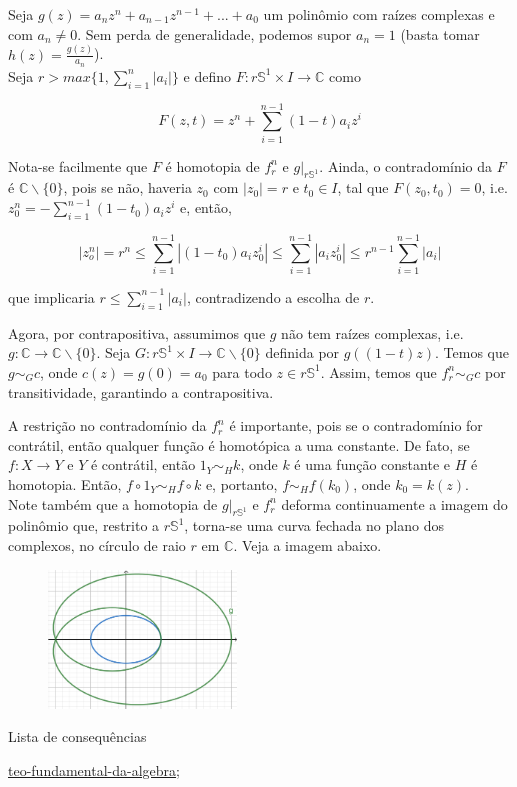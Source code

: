 \begin{dem}
    Seja $g(z) = a_nz^n + a_{n - 1}z^{n - 1} +...+ a_0$
um polinômio com raízes complexas e com $a_n \neq 0$. Sem perda de generalidade, podemos supor $a_n = 1$ (basta tomar $h(z) = \frac{g(z)}{a_n}$).\\ Seja $r > max\{1, \sum_{i = 1}^n|a_i|\}$ e defino $F:r\mathbb{S}^1\times I \rightarrow \mathbb{C}$ como

$$F(z, t) = z^n + \sum_{i = 1}^{n-1}(1 - t)a_iz^i$$

Nota-se facilmente que $F$ é homotopia de $f_r^n$ e $g|_{r\mathbb{S}^1}$. Ainda, o contradomínio da $F$ é $\mathbb{C}\backslash \{0\}$, pois se não, haveria $z_0$ com $|z_0| = r$ e $t_0 \in I$, tal que $F(z_0, t_0) = 0$, i.e. $z_0^n = -\sum_{i = 1}^{n - 1}(1 - t_0)a_iz^i$ e, então, 

$$|z_o^n| = r^n \leq \sum_{i = 1}^{n - 1}|(1 - t_0)a_iz_0^i| \leq \sum_{i = 1}^{n - 1}|a_iz_0^i| \leq r^{n-1}\sum_{i = 1}^{n - 1}|a_i|$$

que implicaria $r \leq \sum_{i = 1}^{n - 1}|a_i|$, contradizendo a escolha de $r$.

Agora, por contrapositiva, assumimos que $g$ não tem raízes complexas, i.e. $g:\mathbb{C} \rightarrow \mathbb{C}\backslash\{0\}$. Seja $G: r\mathbb{S}^1\times I \rightarrow \mathbb{C}\backslash\{0\}$ definida por $g((1 - t)z)$. Temos que $g \sim_G c$, onde $c(z) = g(0) = a_0$ para todo $z \in r\mathbb{S}^1$. Assim, temos que $f_r^n \sim_G c$ por transitividade, garantindo a contrapositiva.  

\end{dem}
A restrição no contradomínio da $f_r^n$ é importante, pois se o contradomínio for contrátil, então qualquer função é homotópica a uma constante. De fato, se $f:X \rightarrow Y$ e $Y$ é contrátil, então $1_Y \sim_H k$, onde $k$ é uma função constante e $H$ é homotopia. Então, $f\circ1_Y \sim_H f\circ k$ e, portanto, $f \sim_H f(k_0)$, onde $k_0 = k(z)$. \\

Note também que a homotopia de $g|_{r\mathbb{S}^1}$ e $f_r^n$ deforma continuamente a imagem do polinômio que, restrito a $r\mathbb{S}^1$, torna-se uma curva fechada no plano dos complexos, no círculo de raio $r$ em $\mathbb{C}$. Veja a imagem abaixo.

\begin{figure}[h]
\includegraphics[width = 5cm]{homotopia.png}
\end{figure}

\begin{titlemize}{Lista de consequências}
	\item \hyperref[teo-fundamental-da-algebra]{teo-fundamental-da-algebra};\\ 
	
\end{titlemize}
